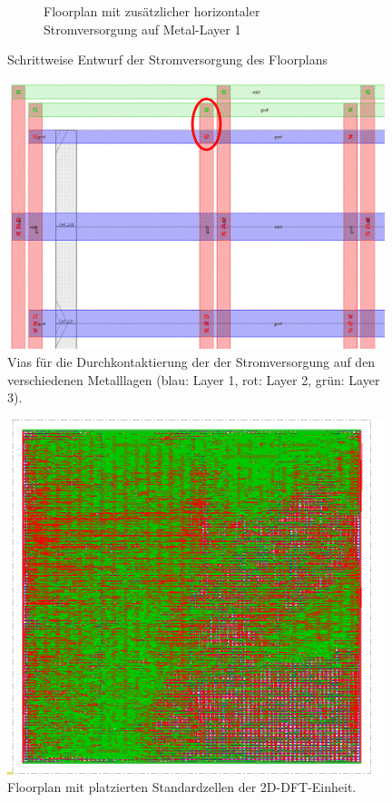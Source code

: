 \begin{figure}
\begin{subfigure}[b]{0.475\textwidth}
            \caption{{\small Floorplan mit zusätzlicher horizontaler Stromversorgung auf Metal-Layer 1}}    
            \label{pic:floorplan4}
        \end{subfigure}
        \caption{Schrittweise Entwurf der Stromversorgung des Floorplans} 
        \label{fig:floorplanSpannungsversorgung}
    \end{figure}

    
    \begin{figure}[ht!]
     \centering
     \includegraphics[width=0.98\textwidth]{img/DFT_FLOORPLAN/CROPPED_IMG/Vias.png}
     \caption{Vias für die Durchkontaktierung der der Stromversorgung auf den verschiedenen Metalllagen (blau: Layer 1, rot: Layer 2, grün: Layer 3).}
     \label{pic:floorplanVias}
    \end{figure}
    
    
    \begin{figure}[ht!]
     \centering
     \includegraphics[width=0.98\textwidth]{img/DFT_FLOORPLAN/CROPPED_IMG/FP_5.png}
     \caption{Floorplan mit platzierten Standardzellen der 2D-DFT-Einheit.}
     \label{pic:floorplan1Standardzellen}
    \end{figure}